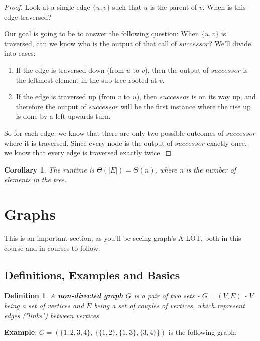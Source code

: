 \documentclass[12pt]{article}
\newtheorem{corollary}[thm]{Corollary} \newtheorem{claim}[thm]{Claim}
\newtheorem{definition}{Definition} \newtheorem{remark}{Remark}
\begin{document}
\begin{proof}
Look at a single edge $\{u,v\}$ such that $u$ is the parent of $v$. When is this edge traversed? 

Our goal is going to be to answer the following question: When $\{u,v\}$ is traversed, can we know who is the output of that call of $successor$? We'll divide into cases:
\begin{enumerate}
    \item If the edge is traversed down (from $u$ to $v$), then the output of $successor$ is the leftmost element in the sub-tree rooted at $v$.
    \item If the edge is traversed up (from $v$ to $u$), then $successor$ is on its way up, and therefore the output of $successor$ will be the first instance where the rise up is done by a left upwards turn.
\end{enumerate}
So for each edge, we know that there are only two possible outcomes of $successor$ where it is traversed. Since every node is the output of $successor$ exactly once, we know that every edge is traversed exactly twice. 
\end{proof}

\begin{corollary}
The runtime is $\Theta(|E|)=\Theta(n)$, where n is the number of elements in the tree.
\end{corollary}

\section{Graphs}
This is an important section, as you'll be seeing graph's A LOT, both in this course and in courses to follow. 

\subsection{Definitions, Examples and Basics}

\begin{definition}
A \textbf{non-directed graph} $G$ is a pair of two sets - $G=(V, E)$ - $V$ being a set of vertices and $E$ being a set of couples of vertices, which represent edges ("links") between vertices.
\end{definition}

\textbf{Example}: $G = (\{1,2,3,4\},\ \{\{1,2\}, \{1,3\}, \{3,4\}\})$ is the following graph:\\ \\
\end{document}

